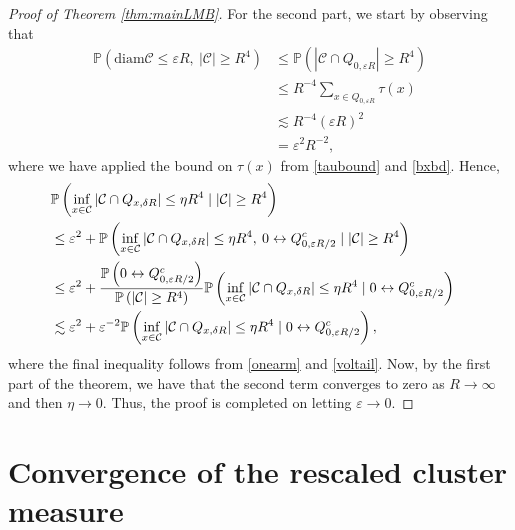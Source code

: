 \documentclass[11pt]{article}
\theoremstyle{definition}
\theoremstyle{remark}
\newcommand{\bP}{\mathbb{P}}
\numberwithin{equation}{section}
\theoremstyle{plain}
\theoremstyle{definition}
\theoremstyle{remark}
\theoremstyle{plain}
\begin{document}
\begin{proof}[Proof of Theorem \ref{thm:mainLMB}]
For the second part, we start by observing that
\begin{align*}
\bP\left(\mathrm{diam}\mathcal{C}\leq \varepsilon R,\:|\mathcal{C}|\geq R^4\right)&\leq \bP\left(|\mathcal{C}\cap Q_{0,\varepsilon R}|\geq R^4\right)\\
&\leq R^{-4} \sum_{x\in Q_{0,\varepsilon R}}\tau(x)\\
&\lesssim  R^{-4}(\varepsilon R)^2\\
&=\varepsilon^2R^{-2},
\end{align*}
where we have applied the bound on $\tau(x)$ from \eqref{taubound} and \eqref{bxbd}. Hence,
\begin{align*}
    \lefteqn{\bP\left(\inf_{x\in \mathcal{C}}\left|\mathcal{C}\cap Q_{x,\delta R}\right|\leq \eta R^4\mid|\mathcal{C}|\geq R^4\right)}\\
    &\leq \varepsilon^2+\bP\left(\inf_{x\in \mathcal{C}}\left|\mathcal{C}\cap Q_{x,\delta R}\right|\leq \eta R^4,\:0\leftrightarrow Q_{0,{\varepsilon R/2}}^c\mid|\mathcal{C}|\geq R^4\right)\\
    &\leq \varepsilon^2+\frac{\bP\left(0\leftrightarrow Q_{0,{\varepsilon R/2}}^c\right)}{\bP\left(|\mathcal{C}|\geq R^4\right)}\bP\left(\inf_{x\in \mathcal{C}}\left|\mathcal{C}\cap Q_{x,\delta R}\right|\leq \eta R^4\mid0\leftrightarrow Q_{0,{\varepsilon R/2}}^c\right)\\
    &\lesssim \varepsilon^2+\varepsilon^{-2}\bP\left(\inf_{x\in \mathcal{C}}\left|\mathcal{C}\cap Q_{x,\delta R}\right|\leq \eta R^4\mid0\leftrightarrow Q_{0,{\varepsilon R/2}}^c\right),
\end{align*}
where the final inequality follows from \eqref{onearm} and \eqref{voltail}. Now, by the first part of the theorem, we have that the second term converges to zero as $R\rightarrow\infty$ and then $\eta\rightarrow0$. Thus, the proof is completed on letting $\varepsilon\rightarrow 0$.
\end{proof}

\section{Convergence of the rescaled cluster measure}
\label{sec:measureconv}
\end{document}
